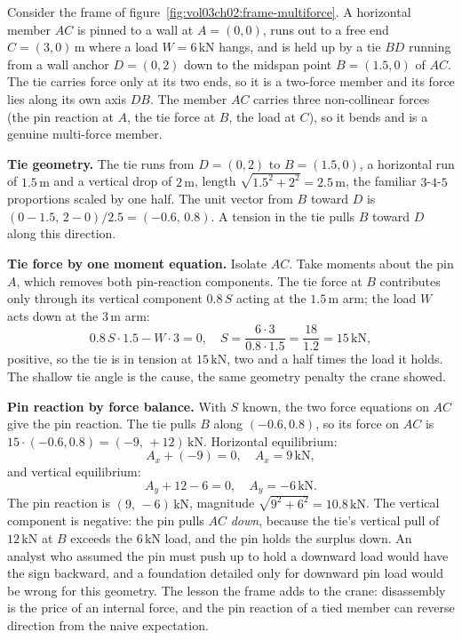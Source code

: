 Consider the frame of figure~\ref{fig:vol03ch02:frame-multiforce}. A
horizontal member $AC$ is pinned to a wall at $A = (0, 0)$, runs out to a
free end $C = (3, 0)\,\si{\meter}$ where a load $W = 6\,\text{kN}$ hangs,
and is held up by a tie $BD$ running from a wall anchor $D = (0, 2)$ down
to the midspan point $B = (1.5, 0)$ of $AC$. The tie carries force only
at its two ends, so it is a two-force member and its force lies along its
own axis $DB$. The member $AC$ carries three non-collinear forces (the
pin reaction at $A$, the tie force at $B$, the load at $C$), so it bends
and is a genuine multi-force member.



\textbf{Tie geometry.} The tie runs from $D = (0, 2)$ to $B = (1.5, 0)$,
a horizontal run of $1.5\,\si{\meter}$ and a vertical drop of
$2\,\si{\meter}$, length $\sqrt{1.5^2 + 2^2} = 2.5\,\si{\meter}$, the
familiar $3$-$4$-$5$ proportions scaled by one half. The unit vector from
$B$ toward $D$ is $(0 - 1.5,\, 2 - 0)/2.5 = (-0.6,\, 0.8)$. A tension in
the tie pulls $B$ toward $D$ along this direction.

\textbf{Tie force by one moment equation.} Isolate $AC$. Take moments
about the pin $A$, which removes both pin-reaction components. The tie
force at $B$ contributes only through its vertical component $0.8\,S$
acting at the $1.5\,\si{\meter}$ arm; the load $W$ acts down at the
$3\,\si{\meter}$ arm:
\[
0.8\,S \cdot 1.5 - W \cdot 3 = 0, \quad
S = \frac{6 \cdot 3}{0.8 \cdot 1.5} = \frac{18}{1.2} = 15\,\text{kN},
\]
positive, so the tie is in tension at $15\,\text{kN}$, two and a half
times the load it holds. The shallow tie angle is the cause, the same
geometry penalty the crane showed.

\textbf{Pin reaction by force balance.} With $S$ known, the two force
equations on $AC$ give the pin reaction. The tie pulls $B$ along
$(-0.6, 0.8)$, so its force on $AC$ is $15 \cdot (-0.6, 0.8) =
(-9,\, +12)\,\text{kN}$. Horizontal equilibrium:
\[
A_x + (-9) = 0, \quad A_x = 9\,\text{kN},
\]
and vertical equilibrium:
\[
A_y + 12 - 6 = 0, \quad A_y = -6\,\text{kN}.
\]
The pin reaction is $(9,\, -6)\,\text{kN}$, magnitude
$\sqrt{9^2 + 6^2} = 10.8\,\text{kN}$. The vertical component is
negative: the pin pulls $AC$ \emph{down}, because the tie's vertical pull
of $12\,\text{kN}$ at $B$ exceeds the $6\,\text{kN}$ load, and the pin
holds the surplus down. An analyst who assumed the pin must push up to
hold a downward load would have the sign backward, and a foundation
detailed only for downward pin load would be wrong for this geometry. The
lesson the frame adds to the crane: disassembly is the price of an
internal force, and the pin reaction of a tied member can reverse
direction from the naive expectation.

